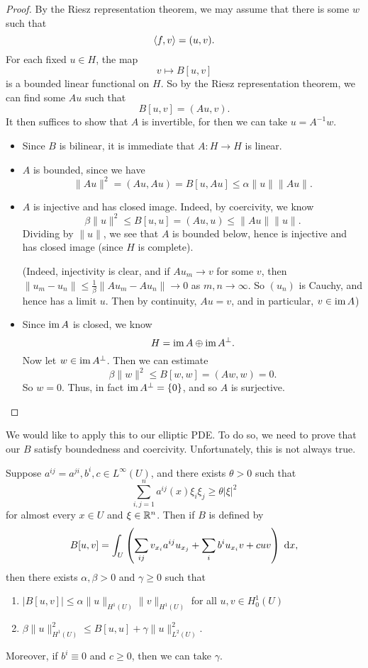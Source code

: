 \documentclass[a4paper]{article}
\begin{document}
\begin{proof}
  By the Riesz representation theorem, we may assume that there is some $w$ such that
  \[
    \langle f, v\rangle = (u, v).
  \]
  For each fixed $u \in H$, the map
  \[
    v \mapsto B[u, v]
  \]
  is a bounded linear functional on $H$. So by the Riesz representation theorem, we can find some $Au$ such that
  \[
    B[u, v] = (Au, v).
  \]
  It then suffices to show that $A$ is invertible, for then we can take $u = A^{-1} w$.

  \begin{itemize}
    \item Since $B$ is bilinear, it is immediate that $A: H \to H$ is linear.
    \item $A$ is bounded, since we have
      \[
        \|Au\|^2 = (Au, Au) = B[u, Au]\leq \alpha \|u\| \|Au\|.
      \]
    \item $A$ is injective and has closed image. Indeed, by coercivity, we know
      \[
        \beta \|u\|^2 \leq B[u, u] = (Au, u) \leq \|A u\| \|u\|.
      \]
      Dividing by $\|u\|$, we see that $A$ is bounded below, hence is injective and has closed image (since $H$ is complete).

      (Indeed, injectivity is clear, and if $A u_m \to v$ for some $v$, then $\|u_m - u_n\| \leq \frac{1}{\beta} \|A u_m - A u_n\| \to 0$ as $m, n \to \infty$. So $(u_n)$ is Cauchy, and hence has a limit $u$. Then by continuity, $A u = v$, and in particular, $v \in \operatorname{im} A$)

    \item Since $\operatorname{im} A$ is closed, we know
      \[
        H = \operatorname{im} A \oplus \operatorname{im} A ^\perp.
      \]
      Now let $w \in \operatorname{im} A^\perp$. Then we can estimate
      \[
        \beta\|w\|^2 \leq B[w, w] = (Aw, w) = 0.
      \]
      So $w = 0$. Thus, in fact $\operatorname{im} A^\perp = \{0\}$, and so $A$ is surjective.\qedhere
 \end{itemize}
\end{proof}

We would like to apply this to our elliptic PDE. To do so, we need to prove that our $B$ satisfy boundedness and coercivity. Unfortunately, this is not always true.

\begin{thm}
  Suppose $a^{ij} = a^{ji}, b^i, c \in L^\infty(U)$, and there exists $\theta > 0$ such that
  \[
    \sum_{i, j = 1}^n a^{ij}(x) \xi_i \xi_j \geq \theta |\xi|^2
  \]
  for almost every $x \in U$ and $\xi \in \mathbb{R}^n$. Then if $B$ is defined by
  \[
    B[u, v] = \int_U \left(\sum_{ij} v_{x_i} a^{ij} u_{x_j} + \sum_i b^i u_{x_i}v + c uv\right)\;\mathrm{d} x,
  \]
  then there exists $\alpha, \beta > 0$ and $\gamma \geq 0$ such that
  \begin{enumerate}
    \item $|B[u, v]| \leq \alpha \|u\|_{H^1(U)} \|v\|_{H^1(U)}$ for all $u, v \in H_0^1(U)$
    \item $\beta\|u\|^2_{H^1(U)} \leq B[u, u] + \gamma \|u\|_{L^2(U)}^2$.
  \end{enumerate}
  Moreover, if $b^i \equiv 0$ and $c \geq 0$, then we can take $\gamma$.
\end{thm}
\end{document}
